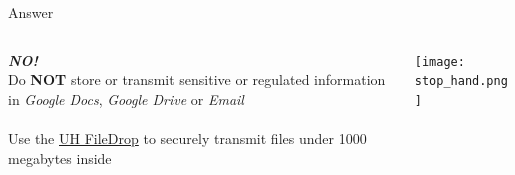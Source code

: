 \begin{frame}
{\begin{block}{Answer}
\begin{columns}
\begin{column}{0.70\textwidth}
    \centering
    {\HUGE \textbf{\textit{NO!}}}\Large~\\Do \textbf{NOT} store or transmit sensitive or regulated information in \emph{Google Docs}, \emph{Google Drive} or \emph{Email}~\\~\\Use the \href{https://www.hawaii.edu/filedrop/}{UH FileDrop} to securely transmit files under 1000 megabytes inside
\end{column}
\begin{column}{0.15\textwidth}\texttt{[image: stop\_hand.png]}\end{column}
\end{columns}
    \end{block}}
\end{frame}



